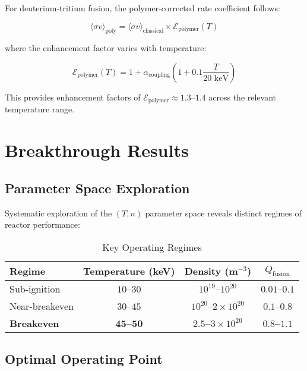\documentclass[12pt,a4paper]{article}
\begin{document}
For deuterium-tritium fusion, the polymer-corrected rate coefficient follows:

\begin{equation}
\langle\sigma v\rangle_{\text{poly}} = \langle\sigma v\rangle_{\text{classical}} \times \mathcal{E}_{\text{polymer}}(T)
\end{equation}

where the enhancement factor varies with temperature:

\begin{equation}
\mathcal{E}_{\text{polymer}}(T) = 1 + \alpha_{\text{coupling}} \left(1 + 0.1 \frac{T}{20 \text{ keV}}\right)
\end{equation}

This provides enhancement factors of $\mathcal{E}_{\text{polymer}} \approx 1.3$--$1.4$ across the relevant temperature range.

\section{Breakthrough Results}

\subsection{Parameter Space Exploration}

Systematic exploration of the $(T, n)$ parameter space reveals distinct regimes of reactor performance:

\begin{table}[H]
\centering
\caption{Key Operating Regimes}
\begin{tabular}{@{}lccc@{}}
\toprule
\textbf{Regime} & \textbf{Temperature (keV)} & \textbf{Density (m$^{-3}$)} & \textbf{$Q_{\text{fusion}}$} \\
\midrule
Sub-ignition & $10$--$30$ & $10^{19}$--$10^{20}$ & $0.01$--$0.1$ \\
Near-breakeven & $30$--$45$ & $10^{20}$--$2 \times 10^{20}$ & $0.1$--$0.8$ \\
\textcolor{breakthrough}{\textbf{Breakeven}} & \textcolor{breakthrough}{\textbf{45--50}} & \textcolor{breakthrough}{\textbf{$2.5$--$3 \times 10^{20}$}} & \textcolor{breakthrough}{\textbf{$0.8$--$1.1$}} \\
\bottomrule
\end{tabular}
\end{table}

\subsection{Optimal Operating Point}
\end{document}
